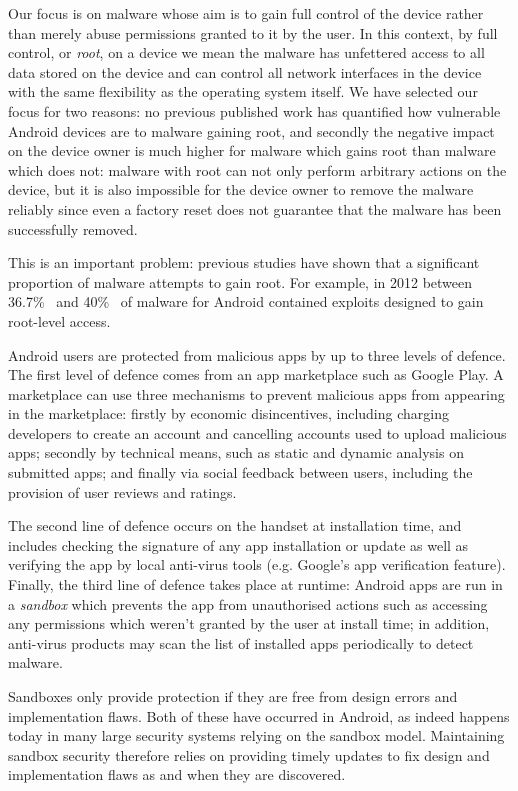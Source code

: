 \documentclass{llncs}
\begin{document}
Our focus is on malware whose aim is to gain full control of the device rather than merely abuse permissions granted to it by the user.
In this context, by full control, or \emph{root}, on a device we mean the malware has unfettered access to all data stored on the device and can control all network interfaces in the device with the same flexibility as the operating system itself.
We have selected our focus for two reasons: no previous published work has quantified how vulnerable Android devices are to malware gaining root, and secondly the negative impact on the device owner is much higher for malware which gains root than malware which does not: malware with root can not only perform arbitrary actions on the device, but it is also impossible for the device owner to remove the malware reliably since even a factory reset does not guarantee that the malware has been successfully removed. 

This is an important problem: previous studies have shown that a significant proportion of malware attempts to gain root.
For example, in 2012 between 36.7\%~\cite{Zhou2012b} and 40\%~\cite{Zhou2012a} of malware for Android contained exploits designed to gain root-level access.

Android users are protected from malicious apps by up to three levels of defence. 
The first level of defence comes from an app marketplace such as Google Play. 
A marketplace can use three mechanisms to prevent malicious apps from appearing in the marketplace: firstly by economic disincentives, including charging developers to create an account and cancelling accounts used to upload malicious apps; secondly by technical means, such as static and dynamic analysis on submitted apps; and finally via social feedback between users, including the provision of user reviews and ratings. 

The second line of defence occurs on the handset at installation time, and includes checking the signature of any app installation or update as well as verifying the app by local anti-virus tools (e.g. Google's app verification feature).
Finally, the third line of defence takes place at runtime: Android apps are run in a \emph{sandbox} which prevents the app from unauthorised actions such as accessing any permissions which weren't granted by the user at install time; in addition, anti-virus products may scan the list of installed apps periodically to detect malware.

Sandboxes only provide protection if they are free from design errors and implementation flaws. 
Both of these have occurred in Android, as indeed happens today in many large security systems relying on the sandbox model. 
Maintaining sandbox security therefore relies on providing timely updates to fix design and implementation flaws as and when they are discovered.
\end{document}

